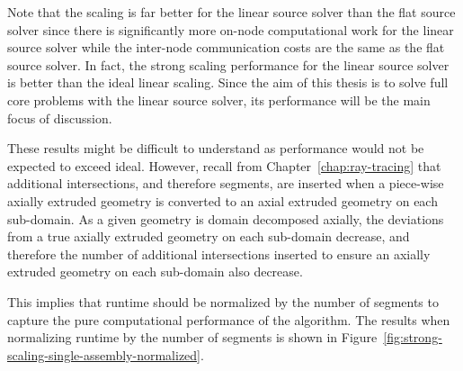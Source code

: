 Note that the scaling is far better for the linear source solver than the flat source solver since there is significantly more on-node computational work for the linear source solver while the inter-node communication costs are the same as the flat source solver. In fact, the strong scaling performance for the linear source solver is better than the ideal linear scaling. Since the aim of this thesis is to solve full core problems with the linear source solver, its performance will be the main focus of discussion.

These results might be difficult to understand as performance would not be expected to exceed ideal. However, recall from Chapter~\ref{chap:ray-tracing} that additional intersections, and therefore segments, are inserted when a piece-wise axially extruded geometry is converted to an axial extruded geometry on each sub-domain. As a given geometry is domain decomposed axially, the deviations from a true axially extruded geometry on each sub-domain decrease, and therefore the number of additional intersections inserted to ensure an axially extruded geometry on each sub-domain also decrease.

This implies that runtime should be normalized by the number of segments to capture the pure computational performance of the algorithm. The results when normalizing runtime by the number of segments is shown in Figure~\ref{fig:strong-scaling-single-assembly-normalized}. 

